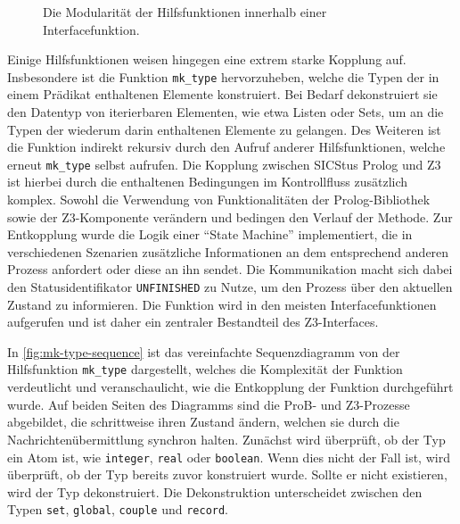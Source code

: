 \begin{figure}[!htp]
\begin{tikzpicture}[scale=1, every node/.style={scale=1}]

    \end{tikzpicture}
    \caption{Die Modularität der Hilfsfunktionen innerhalb einer Interfacefunktion.}
    \label{fig:help_modular}
\end{figure}

Einige Hilfsfunktionen weisen hingegen eine extrem starke Kopplung auf.
Insbesondere ist die Funktion \texttt{mk\_type} hervorzuheben, welche die Typen der in einem Prädikat enthaltenen Elemente konstruiert.
Bei Bedarf dekonstruiert sie den Datentyp von iterierbaren Elementen, wie etwa Listen oder Sets, um an die Typen der wiederum darin enthaltenen Elemente zu gelangen.
Des Weiteren ist die Funktion indirekt rekursiv durch den Aufruf anderer Hilfsfunktionen, welche erneut \texttt{mk\_type} selbst aufrufen.
Die Kopplung zwischen SICStus Prolog und Z3 ist hierbei durch die enthaltenen Bedingungen im Kontrollfluss zusätzlich komplex.
Sowohl die Verwendung von Funktionalitäten der Prolog-Bibliothek sowie der Z3-Komponente verändern und bedingen den Verlauf der Methode.
Zur Entkopplung wurde die Logik einer \enquote{State Machine} implementiert, die in verschiedenen Szenarien zusätzliche Informationen
an dem entsprechend anderen Prozess anfordert oder diese an ihn sendet.
Die Kommunikation macht sich dabei den Statusidentifikator \texttt{UNFINISHED} zu Nutze, um den Prozess über den aktuellen Zustand zu informieren.
Die Funktion wird in den meisten Interfacefunktionen aufgerufen und ist daher ein zentraler Bestandteil des Z3-Interfaces.

In \cref{fig:mk-type-sequence} ist das vereinfachte Sequenzdiagramm von der Hilfsfunktion \texttt{mk\_type} dargestellt, welches die Komplexität der Funktion verdeutlicht
und veranschaulicht, wie die Entkopplung der Funktion durchgeführt wurde.
Auf beiden Seiten des Diagramms sind die ProB- und Z3-Prozesse abgebildet, die schrittweise ihren Zustand ändern, welchen sie durch die Nachrichtenübermittlung synchron halten.
Zunächst wird überprüft, ob der Typ ein Atom ist, wie \texttt{integer}, \texttt{real} oder \texttt{boolean}.
Wenn dies nicht der Fall ist, wird überprüft, ob der Typ bereits zuvor konstruiert wurde.
Sollte er nicht existieren, wird der Typ dekonstruiert. Die Dekonstruktion unterscheidet zwischen den Typen \texttt{set}, \texttt{global}, \texttt{couple} und \texttt{record}.

